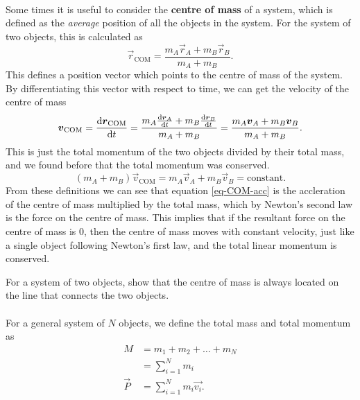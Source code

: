 \documentclass[../classical_mechanics.tex]{subfiles}
\begin{document}
        \paragraph{}
        Some times it is useful to consider the \textbf{centre of mass} of a system, which is defined as the \textit{average} position of all the objects in the system.
        For the system of two objects, this is calculated as
        \begin{equation}
            \vec{r}_\text{COM}=\frac{m_A\vec{r}_A+m_B\vec{r}_B}{m_A+m_B}.
        \end{equation}
        This defines a position vector which points to the centre of mass of the system.
        By differentiating this vector with respect to time, we can get the velocity of the centre of mass
        \begin{equation}
            \vec{v}_\text{COM}=\dv{\vec{r}_\text{COM}}{t}=\frac{m_A\dv{\vec{r}_A}{t}+m_B\dv{\vec{r}_B}{t}}{m_A+m_B}=\frac{m_A\vec{v}_A+m_B\vec{v}_B}{m_A+m_B}.
        \end{equation}
        This is just the total momentum of the two objects divided by their total mass, and we found before that the total momentum was conserved.
        \begin{equation}
            (m_A+m_B)\vec{v}_\text{COM}=m_A\vec{v}_A+m_B\vec{v}_B=\text{constant}.
        \end{equation}
        From these definitions we can see that equation \ref{eq-COM-acc} is the accleration of the centre of mass multiplied by the total mass, which by Newton's second law is the force on the centre of mass.
        This implies that if the resultant force on the centre of mass is 0, then the centre of mass moves with constant velocity, just like a single object following Newton's first law, and the total linear momentum is conserved.
        \begin{example}
            For a system of two objects, show that the centre of mass is always located on the line that connects the two objects.
        \end{example}

        \paragraph{}
        For a general system of $N$ objects, we define the total mass and total momentum as
        \begin{align}
            M&=m_1+m_2+\dots+m_N\\
            &=\sum_{i=1}^{N}m_i\\
            \vec{P}&=\sum_{i=1}^{N}m_i\vec{v_i}.
        \end{align}
\end{document}
